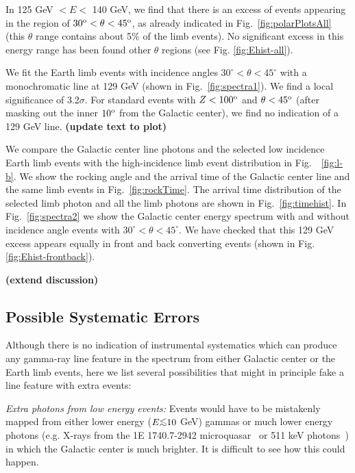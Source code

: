 \documentclass[aps,twocolumn,prd,superscriptaddress,showpacs,nofootinbib,fixfloat]{revtex4}
\newcommand{\degree}{^{\rm o}}
\def\la{\vcenter{\hbox{$<$}\offinterlineskip\hbox{$\sim$}}}
\begin{document}
In 125 GeV $< E <$ 140 GeV, we find that there is an excess of events
appearing in the region of $30\degree < \theta < 45\degree$, as already
indicated in Fig.~\ref{fig:polarPlotsAll} (this $\theta$ range contains about
5\% of the limb events). No significant excess in this energy range has been
found other $\theta$ regions (see Fig. \ref{fig:Ehist-all}). 

We fit the Earth limb events with incidence angles $30^\circ<\theta<45^\circ$
with a monochromatic line at 129 GeV (shown in Fig.~\ref{fig:spectra1}). We
find a local significance of 3.2$\sigma$. For standard events with
$Z<100\degree$ and $\theta<45\degree$ (after masking out the inner $10\degree$
from the Galactic center), we find no indication of a 129 GeV line.
\textbf{(update text to plot)}

We compare the Galactic center line photons and the selected low incidence
Earth limb events with the high-incidence limb event distribution in
Fig.~~\ref{fig:l-b}. We show the rocking angle and the arrival time of the
Galactic center line and the same limb events in Fig.~\ref{fig:rockTime}.  The
arrival time distribution of the selected limb photon and all the limb photons
are shown in Fig.~\ref{fig:timehist}. In Fig.~\ref{fig:spectra2} we show the
Galactic center energy spectrum with and without incidence angle events with
$30^\circ<\theta<45^\circ$.
We have checked that this 129 GeV
excess appears equally in front and back converting events
(shown in Fig. \ref{fig:Ehist-frontback}).



\textbf{(extend discussion)}


\subsection{Possible Systematic Errors}

Although there is no indication of instrumental systematics
which can produce any gamma-ray line feature in the spectrum
from either Galactic center or the Earth limb events, here
we list several possibilities that might in principle fake a
line feature with extra events:

{\it Extra photons from low energy events:} Events would
have to be mistakenly mapped from either lower energy ($E
\la 10$ GeV) gammas or much lower energy photons
(e.g. X-rays from the 1E 1740.7-2942
microquasar~\cite{Gallo:2002} or 511 keV
photons~\cite{Prantzos:2011}) in which the Galactic center
is much brighter.  It is difficult to see how this could
happen.
\end{document}

